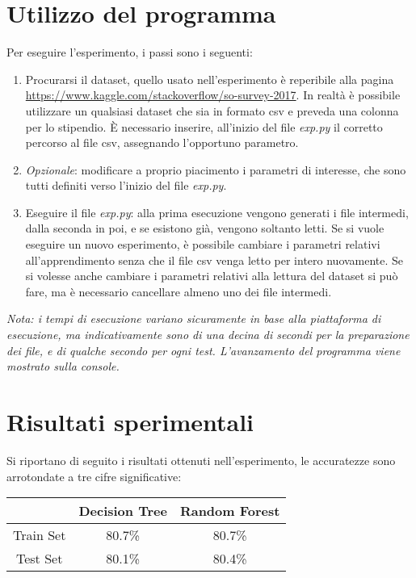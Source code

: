 \documentclass[]{article}
\begin{document}
\section*{Utilizzo del programma}
Per eseguire l'esperimento, i passi sono i seguenti:
\begin{enumerate}
\item Procurarsi il dataset, quello usato nell'esperimento è reperibile alla pagina\\ \url{https://www.kaggle.com/stackoverflow/so-survey-2017}. In realtà è possibile utilizzare un qualsiasi dataset che sia in formato csv e preveda una colonna per lo stipendio. È necessario inserire, all'inizio del file \textit{exp.py} il corretto percorso al file csv, assegnando l'opportuno parametro.
\item \textit{Opzionale}: modificare a proprio piacimento i parametri di interesse, che sono tutti definiti verso l'inizio del file \textit{exp.py}.
\item Eseguire il file \textit{exp.py}: alla prima esecuzione vengono generati i file intermedi, dalla seconda in poi, e se esistono già, vengono soltanto letti. Se si vuole eseguire un nuovo esperimento, è possibile cambiare i parametri relativi all'apprendimento senza che il file csv venga letto per intero nuovamente. Se si volesse anche cambiare i parametri relativi alla lettura del dataset si può fare, ma è necessario cancellare almeno uno dei file intermedi.
\end{enumerate}

\textit{Nota: i tempi di esecuzione variano sicuramente in base alla piattaforma di esecuzione, ma indicativamente sono di una decina di secondi per la preparazione dei file, e di qualche secondo per ogni test. L'avanzamento del programma viene mostrato sulla console.}

\section*{Risultati sperimentali}
Si riportano di seguito i risultati ottenuti nell'esperimento, le accuratezze sono arrotondate a tre cifre significative:

\begin{center}

\begin{tabular}{|c|c|c|}

\hline
& Decision Tree & Random Forest \\
\hline
Train Set & 80.7\% & 80.7\% \\
\hline
Test Set & 80.1\% & 80.4\% \\
\hline

\end{tabular}

\end{center}
\end{document}
